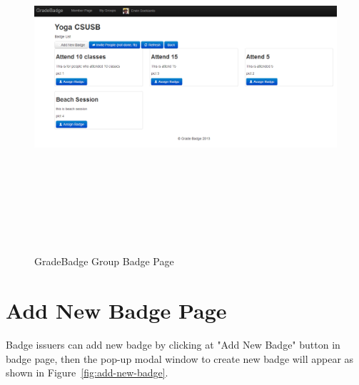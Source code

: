 \vspace{3em}
\begin{figure}[H]
\begin{center}
\includegraphics[height=5.1in,width=6.5in]{images/badge-page.png}
\caption{GradeBadge Group Badge Page}
\label{fig:group-badge}
\end{center}
\end{figure}

\newpage
\section{Add New Badge Page}
Badge issuers can add new badge by clicking at "Add New Badge" button in badge page, then the pop-up modal window to create new badge will appear  as shown in Figure~\ref{fig:add-new-badge}. 

